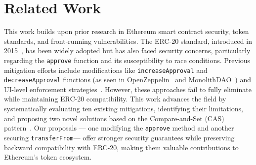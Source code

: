 \section{Related Work}
This work builds upon prior research in Ethereum smart contract security, token standards, and front-running vulnerabilities. The ERC-20 standard, introduced in 2015~\cite{Interface}, has been widely adopted but has also faced security concerns, particularly regarding the \texttt{approve} function and its susceptibility to race conditions. Previous mitigation efforts include modifications like \texttt{increaseApproval} and \texttt{decreaseApproval} functions (as seen in OpenZeppelin~\cite{OpenZeppelin_Token} and MonolithDAO~\cite{monolithdao2017}) and UI-level enforcement strategies~\cite{erc20_ui_mitigation}. However, these approaches fail to fully eliminate \mwa while maintaining ERC-20 compatibility. This work advances the field by systematically evaluating ten existing mitigations, identifying their limitations, and proposing two novel solutions based on the Compare-and-Set (CAS) pattern~\cite{cas_wikipedia}. Our proposals — one modifying the \texttt{approve} method and another securing \texttt{transferFrom}— offer stronger security guarantees while preserving backward compatibility with ERC-20, making them valuable contributions to Ethereum’s token ecosystem.

